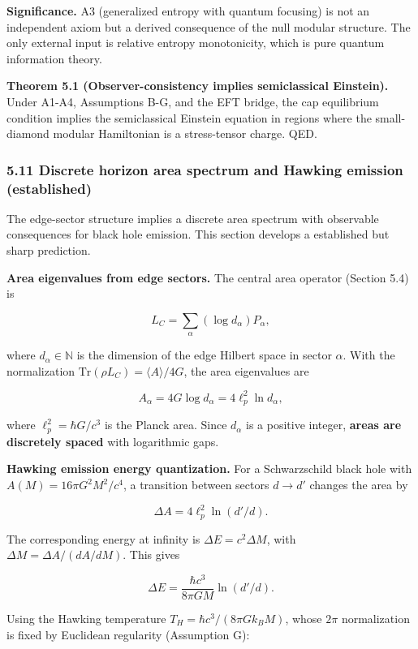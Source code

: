 \textbf{Significance.} A3 (generalized entropy with quantum focusing) is not an independent axiom but a derived consequence of the null modular structure. The only external input is relative entropy monotonicity, which is pure quantum information theory.

\textbf{Theorem 5.1 (Observer-consistency implies semiclassical Einstein).} Under A1-A4, Assumptions B-G, and the EFT bridge, the cap equilibrium condition implies the semiclassical Einstein equation in regions where the small-diamond modular Hamiltonian is a stress-tensor charge. QED.

\subsubsection{5.11 Discrete horizon area spectrum and Hawking emission (established)}\label{511-discrete-horizon-area-spectrum-and-hawking-emission-established}

The edge-sector structure implies a discrete area spectrum with observable consequences for black hole emission. This section develops a established but sharp prediction.

\textbf{Area eigenvalues from edge sectors.} The central area operator (Section 5.4) is

\[
L_C = \sum_\alpha (\log d_\alpha) P_\alpha,
\]

where \(d_\alpha \in \mathbb{N}\) is the dimension of the edge Hilbert space in sector \(\alpha\). With the normalization \(\mathrm{Tr}(\rho L_C) = \langle A
\rangle / 4G\), the area eigenvalues are

\[
A_\alpha = 4G \log d_\alpha = 4\ell_p^2 \ln d_\alpha,
\]

where \(\ell_p^2 = \hbar G/c^3\) is the Planck area. Since \(d_\alpha\) is a positive integer, \textbf{areas are discretely spaced} with logarithmic gaps.

\textbf{Hawking emission energy quantization.} For a Schwarzschild black hole with \(A(M) = 16\pi G^2 M^2/c^4\), a transition between sectors \(d \to d'\) changes the area by

\[
\Delta A = 4\ell_p^2 \ln(d'/d).
\]

The corresponding energy at infinity is \(\Delta E = c^2 \Delta M\), with \(\Delta M = \Delta A / (dA/dM)\). This gives

\[
\Delta E = \frac{\hbar c^3}{8\pi G M} \ln(d'/d).
\]

Using the Hawking temperature \(T_H = \hbar c^3 / (8\pi G k_B M)\), whose \(2\pi\) normalization is fixed by Euclidean regularity (Assumption G):

